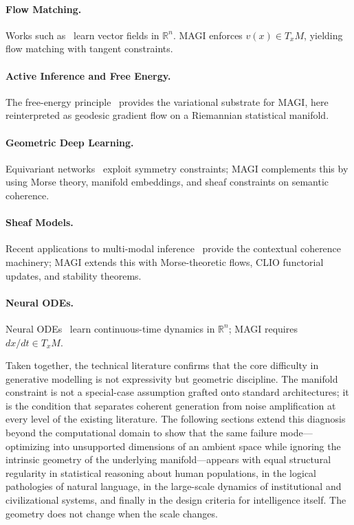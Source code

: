 \documentclass[11pt,a4paper,twocolumn]{article}
\begin{document}
\paragraph{Flow Matching.}
Works such as~\cite{lipman2023flow} learn vector fields in $\mathbb{R}^n$.
MAGI enforces $v(x) \in T_x M$, yielding flow matching with
tangent constraints.

\paragraph{Active Inference and Free Energy.}
The free-energy principle~\cite{friston2010freeenergy,parr2022}
provides the variational substrate for MAGI, here reinterpreted as
geodesic gradient flow on a Riemannian statistical manifold.

\paragraph{Geometric Deep Learning.}
Equivariant networks~\cite{bronstein2021geometric} exploit symmetry
constraints; MAGI complements this by using Morse theory, manifold
embeddings, and sheaf constraints on semantic coherence.

\paragraph{Sheaf Models.}
Recent applications to multi-modal inference~\cite{robinson2021sheaves}
provide the contextual coherence machinery; MAGI extends this with
Morse-theoretic flows, CLIO functorial updates, and stability theorems.

\paragraph{Neural ODEs.}
Neural ODEs~\cite{chen2018neuralode} learn continuous-time dynamics in
$\mathbb{R}^n$; MAGI requires $dx/dt \in T_x M$.

\medskip
\noindent Taken together, the technical literature confirms that the
core difficulty in generative modelling is not expressivity but
geometric discipline. The manifold constraint is not a
special-case assumption grafted onto standard architectures; it is
the condition that separates coherent generation from noise
amplification at every level of the existing literature. The
following sections extend this diagnosis beyond the computational
domain to show that the same failure mode---optimizing into
unsupported dimensions of an ambient space while ignoring the
intrinsic geometry of the underlying manifold---appears with equal
structural regularity in statistical reasoning about human
populations, in the logical pathologies of natural language, in
the large-scale dynamics of institutional and civilizational
systems, and finally in the design criteria for intelligence
itself. The geometry does not change when the scale changes.
\end{document}
